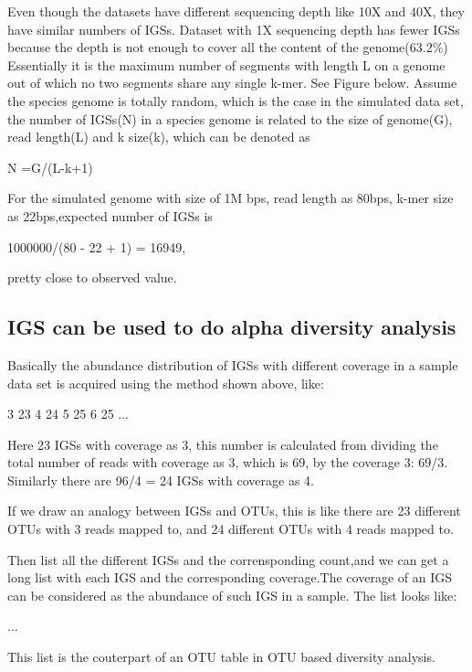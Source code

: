 \documentclass{article}
\begin{document}
Even though the datasets have different sequencing depth like 10X and 40X, they have similar numbers of IGSs. Dataset with 1X sequencing depth has fewer IGSs because the depth is not enough to cover all the content of the genome(63.2\%) Essentially it is the maximum number of segments with length L on a genome out of which no two segments share any single k-mer. See Figure below. Assume the species genome is totally random, which is the case in the simulated data set, the number of IGSs(N) in a species genome is related to the size of genome(G), read length(L) and k size(k), which can be denoted as

N =G/(L-k+1)

For the simulated genome with size of 1M bps, read length as 80bps, k-mer size as 22bps,expected number of IGSs is 

1000000/(80 - 22 + 1) = 16949, 

pretty close to observed value.



\subsection{IGS can be used to do alpha diversity analysis}

Basically the abundance distribution of IGSs with different coverage in a sample data set is acquired using the method shown above, like:

    3 23
    4 24
    5 25
    6 25
    ...

Here 23 IGSs with coverage as 3, this number is calculated from dividing the total number of reads with coverage as 3, which is 69, by the coverage 3: 69/3. Similarly there are 96/4 = 24 IGSs with coverage as 4.

If we draw an analogy between IGSs and OTUs, this is like there are 23 different OTUs with 3 reads mapped to, and 24 different OTUs with 4 reads mapped to. 

Then list all the different IGSs and the corrensponding count,and we can get a long list with each IGS and the corresponding coverage.The coverage of an IGS can be considered as the abundance of such IGS in a sample. The list looks like:

    ...
  
This list is the couterpart of an OTU table in OTU based diversity analysis.
\end{document}
